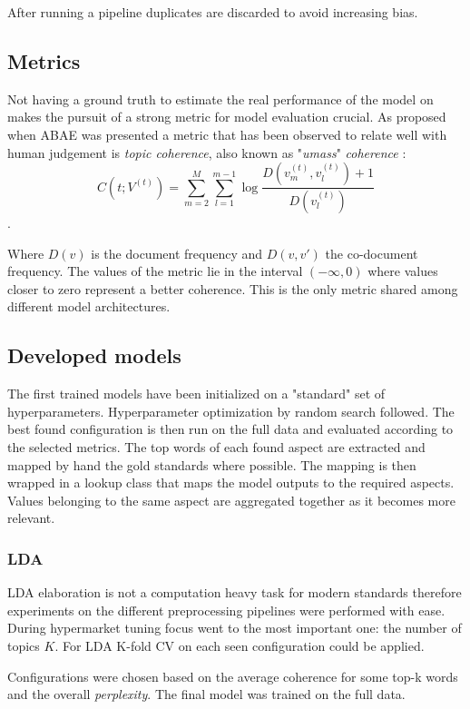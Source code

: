 After running a pipeline duplicates are discarded to avoid increasing bias.

\subsection{Metrics}
Not having a ground truth to estimate the real performance of the model on makes the pursuit of a strong metric
for model evaluation crucial.
As proposed when ABAE was presented \cite{he-etal-2017-unsupervised} a metric that has been observed to relate
well with human judgement is \textit{topic coherence}, also known as "\textit{umass}" \textit{coherence} \cite{mimno-etal-2011-optimizing}:
$$C(t;V^{(t)}) = \sum^M_{m=2} \sum^{m-1}_{l=1} \log \frac{D(v_m^{(t)}, v_l^{(t)}) + 1}{D(v_l^{(t)})} $$.

Where $D(v)$ is the document frequency and $D(v,v')$ the co-document frequency.
The values of the metric lie in the interval $(-\infty, 0)$ where values closer to zero represent a better coherence.
This is the only metric shared among different model architectures.

\subsection{Developed models}
The first trained models have been initialized on a "standard" set of hyperparameters.
Hyperparameter optimization by random search followed.
The best found configuration is then run on the full data and evaluated according to the selected metrics.
The top words of each found aspect are extracted and mapped by hand the gold standards where possible.
The mapping is then wrapped in a lookup class that maps the model outputs to the required aspects.
Values belonging to the same aspect are aggregated together as it becomes more relevant.

\subsubsection{LDA}
LDA elaboration is not a computation heavy task for modern standards therefore experiments on the different
preprocessing pipelines were performed with ease.
During hypermarket tuning focus went to the most important one: the number of topics $K$.
For LDA K-fold CV on each seen configuration could be applied.

Configurations were chosen based on the average coherence for some top-k words and the overall \textit{perplexity}.
The final model was trained on the full data.

